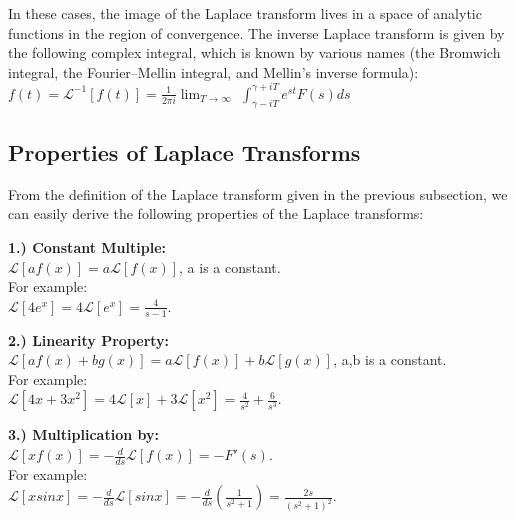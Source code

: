\documentclass[12pt]{article}
\begin{document}
{In these cases, the image of the Laplace transform lives in a space of analytic functions in the region of convergence. The inverse Laplace transform is given by the following complex integral, which is known by various names (the Bromwich integral, the Fourier–Mellin integral, and Mellin's inverse formula):\\

$f(t) = \mathcal{L}^{-1} [f(t)] = \frac{1}{2\pi i} \lim_{T \to \infty}$ \(\int_{\gamma - iT}^{\gamma + iT} e^{st} F(s) ds\)\\

\subsection{Properties of Laplace Transforms}
From the deﬁnition of the Laplace transform given in the previous subsection, we can easily derive the following properties of the Laplace transforms:
\par \textbf{1.)	Constant Multiple:}\\
	$\mathcal{L}[af(x)] = a \mathcal{L}[f(x)]$, a is a constant.\\
For example:\\
	$\mathcal{L}[4e^x] = 4 \mathcal{L}[e^x] = \frac{4}{s - 1}$.\\

\par \textbf{2.)	Linearity Property:}\\
	$\mathcal{L}[af(x) + bg(x)] = a \mathcal{L}[f(x)] +  b \mathcal{L}[g(x)]$, a,b is a constant.\\
For example:\\
	$\mathcal{L}[4x + 3x^2] = 4 \mathcal{L}[x] + 3 \mathcal{L}[x^2]= \frac{4}{s ^2} + \frac{6}{s^3}$.\\
\par \textbf{3.)	Multiplication by:}\\
	$\mathcal{L}[xf(x)] = - \frac{d}{ds} \mathcal{L}[f(x)] = -F'(s)$.\\
For example:\\
	$\mathcal{L}[xsinx] = - \frac{d}{ds} \mathcal{L}[sinx] = - \frac{d}{ds} (\frac{1}{s^2 + 1}) = \frac{2s}{(s^2 + 1)^2}$.\\

}
\end{document}
